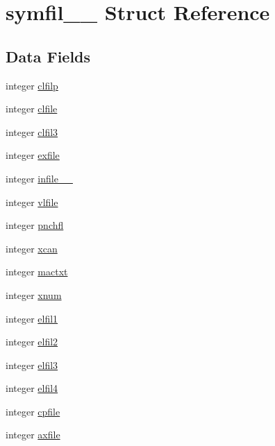 \hypertarget{structsymfil__1__}{}\section{symfil\+\_\+\_\+ Struct Reference}
\label{structsymfil__1__}
\subsection*{Data Fields}
\begin{DoxyCompactItemize}
\item 
integer \hyperlink{structsymfil__1___a03ee4728d8625aca0fa2793bd29d6d59}{clfilp}
\item 
integer \hyperlink{structsymfil__1___a0545f935bcab324df9ce805e04cf2be3}{clfile}
\item 
integer \hyperlink{structsymfil__1___a50d192813f149b8b93f9d708e3f5ef9e}{clfil3}
\item 
integer \hyperlink{structsymfil__1___ab4d28b04f54594b97270b01c1edcc26d}{exfile}
\item 
integer \hyperlink{structsymfil__1___a4d15d6b3cb973e0dafdba8310f1486e8}{infile\+\_\+\+\_\+}
\item 
integer \hyperlink{structsymfil__1___ae403807e27289feefc8d1bdd4f100695}{vlfile}
\item 
integer \hyperlink{structsymfil__1___ae7aa9085413c6e8d876e4fc5323d0767}{pnchfl}
\item 
integer \hyperlink{structsymfil__1___a5bc6b255c4391a8934cafbfaa97be315}{xcan}
\item 
integer \hyperlink{structsymfil__1___a4322c9b3f64c9d4d8548362ce14462b3}{mactxt}
\item 
integer \hyperlink{structsymfil__1___aaae2bbdc122a638a3729362e02678968}{xnum}
\item 
integer \hyperlink{structsymfil__1___a8608696d9e927d49afe7c2e6cc371824}{elfil1}
\item 
integer \hyperlink{structsymfil__1___abce64f97383f4f3ea1298b7207619964}{elfil2}
\item 
integer \hyperlink{structsymfil__1___a8b6348b2bc812d0e7e067f3b51725de8}{elfil3}
\item 
integer \hyperlink{structsymfil__1___a4954b7af926c97dcbb482f83bb2ffc66}{elfil4}
\item 
integer \hyperlink{structsymfil__1___a3a064053ad970c80804b9969a1217396}{cpfile}
\item 
integer \hyperlink{structsymfil__1___a0d8876710542d9ce037cedfe6d501d23}{axfile}

\end{DoxyCompactItemize}
